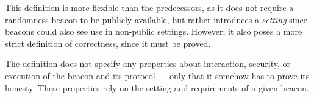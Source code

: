 This definition is more flexible than the predecessors, as it does not require a randomness beacon to be publicly available, but rather introduces a \emph{setting} since beacons could also see use in non-public settings. However, it also poses a more strict definition of correctness, since it must be proved.

The definition does not specify any properties about interaction, security, or execution of the beacon and its protocol --- only that it somehow has to prove its honesty.
These properties rely on the setting and requirements of a given beacon.

